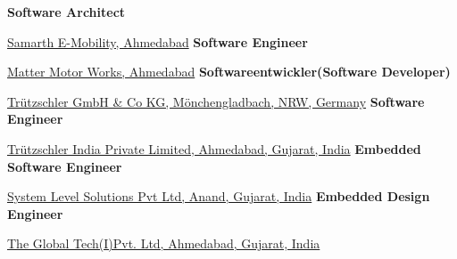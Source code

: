 \vspace*{-6mm}
\begin{rubric}{}
%
    \textbf{Software Architect}\par
    \href{https://www.linkedin.com/company/samarth-e-mobility-pvt-ltd/}{Samarth E-Mobility, Ahmedabad}
%
    \textbf{Software Engineer}\par
    \href{https://matter.in/}{Matter Motor Works, Ahmedabad}
%
    \textbf{Softwareentwickler(Software Developer)}\par
    \href{https://www.truetzschler.de/}{Trützschler GmbH \& Co KG, Mönchengladbach, NRW, Germany}
%
    \textbf{Software Engineer}\par
    \href{https://www.truetzschler.de/}{Trützschler India Private Limited, Ahmedabad, Gujarat, India}
%
	\textbf{Embedded Software Engineer}\par
	\href{http://www.slscorp.com/index.php}{System Level Solutions Pvt Ltd, Anand, Gujarat, India}
%
	\textbf{Embedded Design Engineer}\par
    \href{http://www.thegt.com/}{The Global Tech(I)Pvt. Ltd, Ahmedabad, Gujarat, India}
\end{rubric}